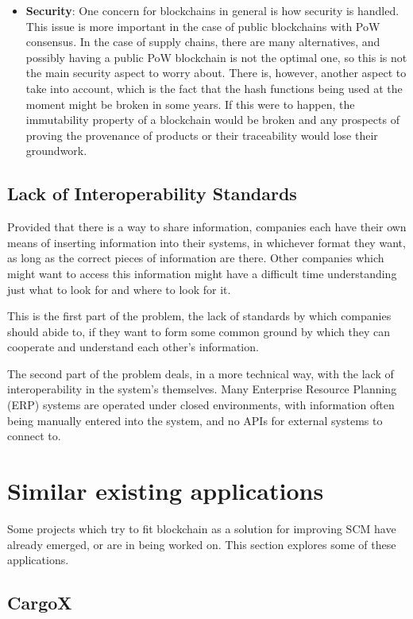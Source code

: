 \begin{itemize}
\item \textbf{Security}: One concern for blockchains in general is how security is handled. This issue is more important in the case of public blockchains with PoW consensus. In the case of supply chains, there are many alternatives, and possibly having a public PoW blockchain is not the optimal one, so this is not the main security aspect to worry about. There is, however, another aspect to take into account, which is the fact that the hash functions being used at the moment might be broken in some years. If this were to happen, the immutability property of a blockchain would be broken and any prospects of proving the provenance of products or their traceability would lose their groundwork.
\end{itemize}

\subsection{Lack of Interoperability Standards}
Provided that there is a way to share information, companies each have their own means of inserting information into their systems, in whichever format they want, as long as the correct pieces of information are there. Other companies which might want to access this information might have a difficult time understanding just what to look for and where to look for it. 

This is the first part of the problem, the lack of standards by which companies should abide to, if they want to form some common ground by which they can cooperate and understand each other's information. 

The second part of the problem deals, in a more technical way, with the lack of interoperability in the system's themselves. Many Enterprise Resource Planning (ERP) systems are operated under closed environments, with information often being manually entered into the system, and no APIs for external systems to connect to.

\section{Similar existing applications}
Some projects which try to fit blockchain as a solution for improving SCM have already emerged, or are in being worked on. This section explores some of these applications.

\subsection{CargoX}

